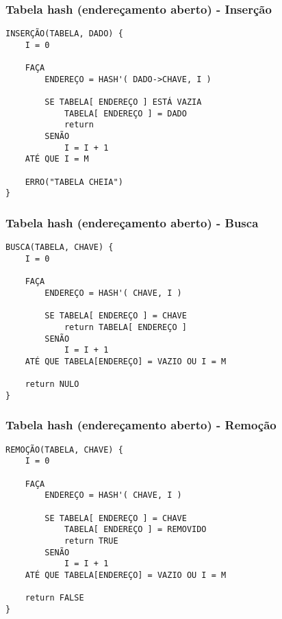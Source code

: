 \documentclass[10pt,svgnames]{beamer}
\begin{document}

\begin{frame}[fragile]
\frametitle{Tabela hash (endereçamento aberto) - Inserção}
\begin{verbatim}
INSERÇÃO(TABELA, DADO) {
    I = 0
    
    FAÇA
        ENDEREÇO = HASH'( DADO->CHAVE, I )
        
        SE TABELA[ ENDEREÇO ] ESTÁ VAZIA
            TABELA[ ENDEREÇO ] = DADO
            return
        SENÃO
            I = I + 1
    ATÉ QUE I = M
    
    ERRO("TABELA CHEIA")
}
\end{verbatim}
\end{frame}

\begin{frame}[fragile]
\frametitle{Tabela hash (endereçamento aberto) - Busca}
\begin{verbatim}
BUSCA(TABELA, CHAVE) {
    I = 0
    
    FAÇA
        ENDEREÇO = HASH'( CHAVE, I )
        
        SE TABELA[ ENDEREÇO ] = CHAVE
            return TABELA[ ENDEREÇO ]
        SENÃO
            I = I + 1
    ATÉ QUE TABELA[ENDEREÇO] = VAZIO OU I = M
    
    return NULO
}
\end{verbatim}
\end{frame}

\begin{frame}[fragile]
\frametitle{Tabela hash (endereçamento aberto) - Remoção}
\begin{verbatim}
REMOÇÃO(TABELA, CHAVE) {
    I = 0
    
    FAÇA
        ENDEREÇO = HASH'( CHAVE, I )
        
        SE TABELA[ ENDEREÇO ] = CHAVE
            TABELA[ ENDEREÇO ] = REMOVIDO
            return TRUE
        SENÃO
            I = I + 1
    ATÉ QUE TABELA[ENDEREÇO] = VAZIO OU I = M
    
    return FALSE
}
\end{verbatim}
\end{frame}




\renewcommand\refname{Referências}

\end{document}
